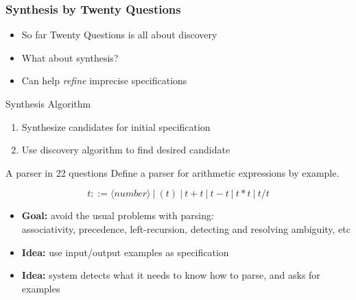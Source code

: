 \newcommand{\lsthaskell}[1]{\lstinline[language=haskell]{#1}}
\newcommand{\Q}{{\color{red}Q:}\hspace{2mm}}
\newcommand{\A}{{\color{blue}A:}\hspace{2mm}}

\begin{frame}[fragile]
\frametitle{Synthesis by Twenty Questions}
\begin{itemize}
\item{So far Twenty Questions is all about discovery}
\item{What about synthesis?}
\item{Can help {\em refine} imprecise specifications}
\end{itemize}

\begin{block}{Synthesis Algorithm}
\begin{enumerate}
\item{Synthesize candidates for initial specification}
\item{Use discovery algorithm to find desired candidate}
\end{enumerate}
\end{block}
\end{frame}

\begin{frame}{A parser in 22 questions}
  Define a parser for arithmetic expressions by example.

\[
  t ::= \langle number \rangle ~|~ ( t ) ~|~ t + t ~|~ t - t ~|~ t * t ~|~ t / t
\]

  \begin{itemize}
  \item{{\bf Goal:} avoid the usual problems with parsing:\\
      associativity, precedence, left-recursion, detecting and
      resolving ambiguity, etc}
  \item{{\bf Idea:} use input/output examples as specification}

  \item{{\bf Idea:} system detects what it needs to know how to parse,
      and asks for examples}
\end{itemize}
\end{frame}

